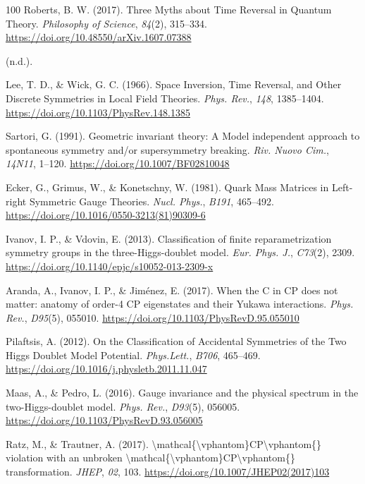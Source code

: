 \documentclass[11pt]{book}
\begin{document}
\begin{thebibliography}{100}
 Roberts, B. W. (2017). Three Myths about Time Reversal in Quantum
Theory. \emph{Philosophy of Science}, \emph{84}(2), 315--334.
\url{https://doi.org/10.48550/arXiv.1607.07388}

 (n.d.).

 Lee, T. D., \& Wick, G. C. (1966). Space Inversion, Time Reversal, and
Other Discrete Symmetries in Local Field Theories. \emph{Phys. Rev.},
\emph{148}, 1385--1404. \url{https://doi.org/10.1103/PhysRev.148.1385}

 Sartori, G. (1991). Geometric invariant theory: A Model independent
approach to spontaneous symmetry and/or supersymmetry breaking.
\emph{Riv. Nuovo Cim.}, \emph{14N11}, 1--120.
\url{https://doi.org/10.1007/BF02810048}

 Ecker, G., Grimus, W., \& Konetschny, W. (1981). Quark Mass Matrices in
Left-right Symmetric Gauge Theories. \emph{Nucl. Phys.}, \emph{B191},
465--492. \url{https://doi.org/10.1016/0550-3213(81)90309-6}

 Ivanov, I. P., \& Vdovin, E. (2013). Classification of finite
reparametrization symmetry groups in the three-Higgs-doublet model.
\emph{Eur. Phys. J.}, \emph{C73}(2), 2309.
\url{https://doi.org/10.1140/epjc/s10052-013-2309-x}

 Aranda, A., Ivanov, I. P., \& Jiménez, E. (2017). When the C in CP does
not matter: anatomy of order-4 CP eigenstates and their Yukawa
interactions. \emph{Phys. Rev.}, \emph{D95}(5), 055010.
\url{https://doi.org/10.1103/PhysRevD.95.055010}

 Pilaftsis, A. (2012). On the Classification of Accidental Symmetries of
the Two Higgs Doublet Model Potential. \emph{Phys.Lett.}, \emph{B706},
465--469. \url{https://doi.org/10.1016/j.physletb.2011.11.047}

 Maas, A., \& Pedro, L. (2016). Gauge invariance and the physical
spectrum in the two-Higgs-doublet model. \emph{Phys. Rev.},
\emph{D93}(5), 056005. \url{https://doi.org/10.1103/PhysRevD.93.056005}

 Ratz, M., \& Trautner, A. (2017).
\textbackslash mathcal\{\textbackslash vphantom\}CP\textbackslash vphantom\{\}
violation with an unbroken
\textbackslash mathcal\{\textbackslash vphantom\}CP\textbackslash vphantom\{\}
transformation. \emph{JHEP}, \emph{02}, 103.
\url{https://doi.org/10.1007/JHEP02(2017)103}


\end{thebibliography}
\end{document}
